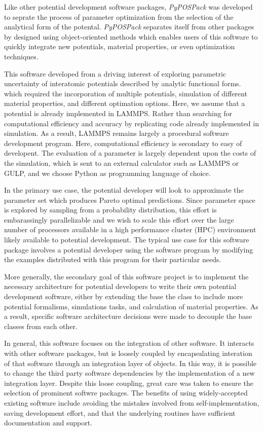 Like other potential development software packages, \emph{PyPOSPack} was developed to seprate the process of parameter optimization from the selection of the analytical form of the potental.  \emph{PyPOSPack} separates itself from other packages by designed using object-oriented methods which enables users of this software to quickly integrate new potentials, material properties, or even optimization techniques.

This software developed from a driving interest of exploring parametric uncertainty of interatomic potentials described by analytic functional forms. which required the incorporation of multiple potentials, simulation of different material properties, and different optimation options.  Here, we assume that a potential is already implemented in LAMMPS.  Rather than searching for computational efficiency and accuracy by replicating code already implemented in simulation.  As a result, LAMMPS remains largely a procedural software development program.  Here, computational efficiency is secondary to easy of developent.  The evaluation of a parameter is largely dependent upon the costs of the simulation, which is sent to an external calculator such as LAMMPS or GULP, and we choose Python as programming language of choice.

In the primary use case, the potential developer will look to approximate the parameter set which produces Pareto optimal predictions.  Since parameter space is explored by sampling from a probability distribution, this effort is embarassingly parallelizable and we wish to scale this effort over the large number of processors available in a high performance cluster (HPC) environment likely available to potential development.  The typical use case for this software package involves a potential developer using the software program by modifying the examples distributed with this program for their particular needs.

More generally, the secondary goal of this software project is to implement the necessary architecture for potential developers to write their own potential development software, either by extending the base the class to include more potential formalisms, simulations tasks, and calculation of material properties.  As a result, specific software architecture decisions were made to decouple the base classes from each other.

In general, this software focuses on the integration of other software.  It interacts with other software packages, but is loosely coupled by encapsulating interation of that software through an integration layer of objects.  In this way, it is possible to change the third party software dependencies by the implementation of a new integration layer.  Despite this loose coupling, great care was taken to ensure the selection of prominent softwre packages.  The benefits of using widely-accepted existing software include avoiding the mistakes involved from self-implementation, saving development effort, and that the underlying routines have sufficient documentation and support.

